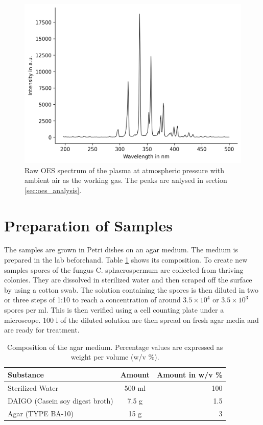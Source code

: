 \begin{figure}
    \centering
    \includegraphics[width=.8\textwidth]{images/OES.png}
    \caption[Raw OES spectrum of the APP]{Raw OES spectrum of the plasma at atmospheric pressure with ambient air as the working gas. The peaks are anlysed in section \ref{sec:oes_analysis}.}
    \label{fig:oes}
\end{figure}

\section{Preparation of Samples}
The samples are grown in Petri dishes on an agar medium. The medium is prepared in the lab beforehand. Table \ref{tab:medium} shows its composition. To create new samples spores of the fungus C. sphaerospermum are collected from thriving colonies. They are dissolved in sterilized water and then scraped off the surface by using a cotton swab. The solution containing the spores is then diluted in two or three steps of 1:10 to reach a concentration of around $3.5\times 10^4$ or $3.5\times 10^3$ spores per ml. This is then verified using a cell counting plate under a microscope. 100 \textmu l of the diluted solution are then spread on fresh agar media and are ready for treatment.

\begin{table}
    \centering
    \caption[Composition of the agar medium]{Composition of the agar medium. Percentage values are expressed as weight per volume (w/v \%).}
    \vspace*{1em}
    \begin{tabular}{lcr}
    Substance & Amount & Amount in w/v \% \\
    \hline
    Sterilized Water & 500 ml & 100 \\
    DAIGO (Casein soy digest broth) & 7.5 g & 1.5 \\
    Agar (TYPE BA-10) & 15 g & 3 \\
    \end{tabular}
    \label{tab:medium}
\end{table}

